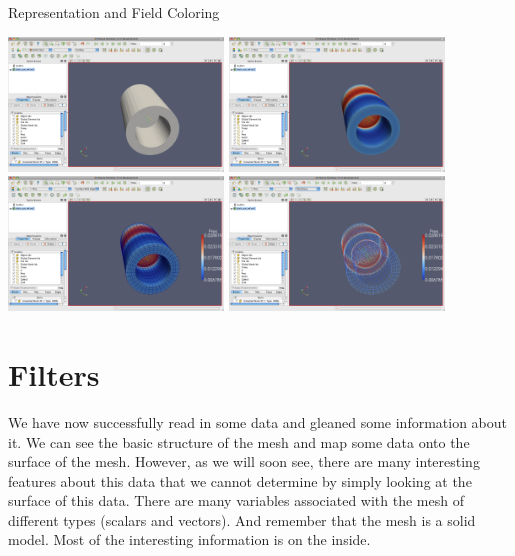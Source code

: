 \begin{exercise}{Representation and Field Coloring}
  \begin{inlinefig}
    \includegraphics[width=2.25in]{images/DataRepresentation1}
    \includegraphics[width=2.25in]{images/DataRepresentation2} \\
    \includegraphics[width=2.25in]{images/DataRepresentation3}
    \includegraphics[width=2.25in]{images/DataRepresentation4}
  \end{inlinefig}
\end{exercise}


\section{Filters}

We have now successfully read in some data and gleaned some information
about it.  We can see the basic structure of the mesh and map some data
onto the surface of the mesh.  However, as we will soon see, there are many
interesting features about this data that we cannot determine by simply
looking at the surface of this data.  There are many variables associated
with the mesh of different types (scalars and vectors).  And remember that
the mesh is a solid model.  Most of the interesting information is on the
inside.

